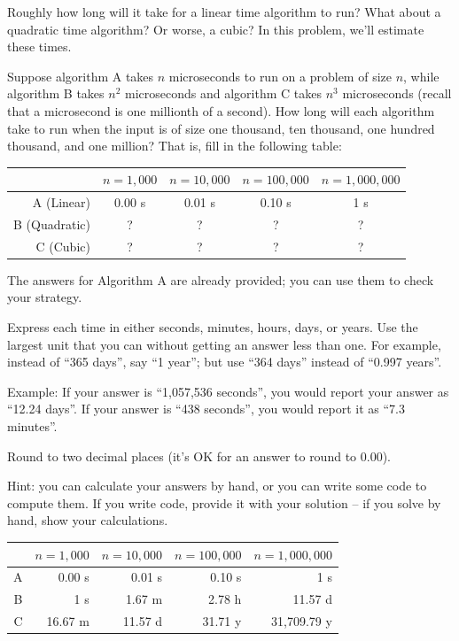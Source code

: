 \begin{prob}
    Roughly how long will it take for a linear time algorithm to run? What
    about a quadratic time algorithm? Or worse, a cubic? In this problem,
    we'll estimate these times.

    Suppose algorithm A takes $n$ microseconds to run on a problem of size $n$,
    while algorithm B takes $n^2$ microseconds and algorithm C takes $n^3$
    microseconds (recall that a microsecond is one millionth of a second).
    How long will each algorithm take to run when the input is of size one
    thousand, ten thousand, one hundred thousand, and one million? That is,
    fill in the following table:

    \begin{center}
    \begin{tabular}{rcccc}
        \toprule
        & $n = 1{,}000$ & $n = 10{,}000$ & $n = 100{,}000$ & $n = 1{,}000{,}000$ \\ \midrule
        A (Linear) & 0.00 s & 0.01 s & 0.10 s & 1 s \\
        B (Quadratic) & ? & ? & ? & ? \\
        C (Cubic) & ? & ? & ? & ? \\\bottomrule
    \end{tabular}
    \end{center}

    The answers for Algorithm A are already provided; you can use them to check your strategy.

    Express each time in either seconds, minutes, hours, days, or years. Use
    the largest unit that you can without getting an answer less than one. For
    example, instead of ``365 days'', say ``1 year''; but use ``364 days''
    instead of ``0.997 years''. 
    
    Example: If your answer is ``1,057,536 seconds'', you would report your answer
    as ``12.24 days''. If your answer is ``438 seconds'', you would report it as ``7.3 minutes''. 
    
    Round to two decimal places (it's OK for an answer to round to 0.00).

    Hint: you can calculate your answers by hand, or you can write some code to compute them.
    If you write code, provide it with your solution -- if you solve by hand, show your calculations.

    \begin{soln}

        \begin{center}
        \begin{tabular}{rrrrr}
            \toprule
            & $n = 1{,}000$ & $n = 10{,}000$ & $n = 100{,}000$ & $n = 1{,}000{,}000$ \\ \midrule
            A & 0.00 s & 0.01 s & 0.10 s & 1 s \\
            B & 1 s & 1.67 m & 2.78 h & 11.57 d \\
            C & 16.67 m & 11.57 d & 31.71 y & 31{,}709.79 y \\\bottomrule
        \end{tabular}
        \end{center}


\end{soln}
\end{prob}

